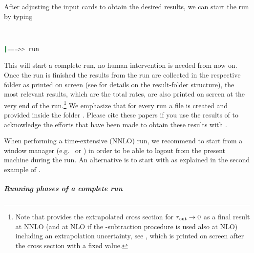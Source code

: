 \documentclass[english,11pt]{article}
\begin{document}
After adjusting the input cards to obtain the desired results, we can start the run by typing
{\tt
\begin{lstlisting}[language=bash]
 |===>> run
\end{lstlisting}
}
This will start a complete run, no human intervention is needed from now on. Once the run is finished the 
results from the run are collected in the respective folder  as printed on screen 
(see  for details on the result-folder structure), the most relevant results, which are the total rates, are also printed on 
screen at the very end of the run.\footnote{Note that \Matrix{} provides the extrapolated cross section for $r_{\mathrm{cut}}{}\rightarrow 0$ as a final result at NNLO (and at NLO if the \qt{}-subtraction procedure is used also at NLO) including an extrapolation uncertainty, see , which is printed on screen after the cross section with a fixed \rcut{} value.} We emphasize that for every run a  file is created and provided inside the folder . Please cite these papers if you use the 
results of \Matrix{} to acknowledge the efforts that have been made to obtain these results with \Matrix{}.

When performing a time-extensive (NNLO) run, we recommend to start \Matrix{} from 
a window manager (e.g.\  or ) in order 
to be able to logout from the present machine during the run. An alternative
is to start \Matrix{} with  as explained in the second example
of .

\subparagraph{\bf Running phases of a complete run}\quad
\end{document}
